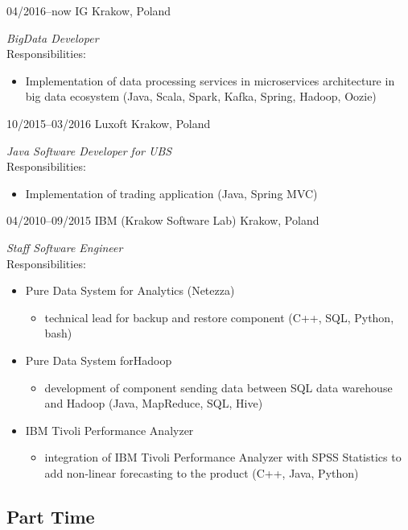 \documentclass[]{gaza-cv} %
\begin{document}
\begin{entrylist}

\entry
{04/2016--now}
{IG}
{Krakow, Poland}
{\emph{ BigData Developer}\\
Responsibilities:
\begin{itemize}
\item Implementation of data processing services in microservices architecture in big data ecosystem (Java, Scala, Spark, Kafka, Spring, Hadoop, Oozie)
\end{itemize}}


\entry
{10/2015--03/2016}
{Luxoft}
{Krakow, Poland}
{\emph{Java Software Developer for UBS}\\
Responsibilities:
\begin{itemize}
\item Implementation of trading application (Java, Spring MVC)
\end{itemize}}


\entry
{04/2010--09/2015}
{IBM (Krakow Software Lab)}
{Krakow, Poland}
{\emph{Staff Software Engineer}\\
Responsibilities:
\begin{itemize}
\item Pure Data System for Analytics (Netezza)
\begin{itemize}
\item technical lead for backup and restore component (C++, SQL, Python, bash)
\end{itemize}
\item Pure Data System forHadoop
\begin{itemize}
\item development of component sending data between SQL data warehouse and Hadoop (Java, MapReduce, SQL, Hive)
\end{itemize}
\item IBM Tivoli Performance Analyzer
\begin{itemize}
\item integration of IBM Tivoli Performance Analyzer with SPSS Statistics to add non-linear forecasting to the product (C++, Java, Python)
\end{itemize}
\end{itemize}}

\end{entrylist}

\subsection{Part Time}
\end{document}
